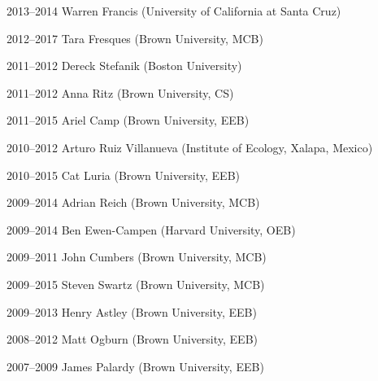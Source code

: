 \begin{entry}{60pt}
\item [\rm 2013--2014] Warren Francis (University of California at Santa Cruz)
\item [\rm 2012--2017] Tara Fresques (Brown University, MCB)
\item [\rm 2011--2012] Dereck Stefanik (Boston University)
\item [\rm 2011--2012] Anna Ritz (Brown University, CS)
\item [\rm 2011--2015] Ariel Camp (Brown University, EEB)
\item [\rm 2010--2012] Arturo Ruiz Villanueva (Institute of Ecology, Xalapa, Mexico)
\item [\rm 2010--2015] Cat Luria (Brown University, EEB)
\item [\rm 2009--2014] Adrian Reich (Brown University, MCB)
\item [\rm 2009--2014] Ben Ewen-Campen (Harvard University, OEB)
\item [\rm 2009--2011] John Cumbers (Brown University, MCB)
\item [\rm 2009--2015] Steven Swartz (Brown University, MCB)
\item [\rm 2009--2013] Henry Astley (Brown University, EEB)
\item [\rm 2008--2012] Matt Ogburn (Brown University, EEB)
\item [\rm 2007--2009] James Palardy (Brown University, EEB)

\end{entry}